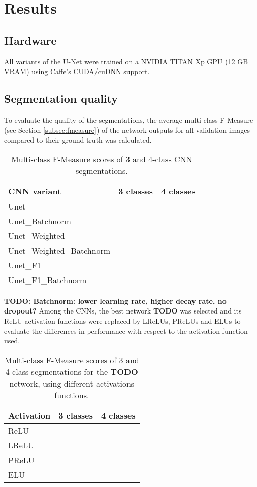 \chapter {Results}
\label{chap:results}

	\section{Hardware}
All variants of the U-Net were trained on a NVIDIA TITAN Xp GPU (12 GB VRAM) using Caffe's CUDA/cuDNN support.

	\section {Segmentation quality}

To evaluate the quality of the segmentations, the average multi-class F-Measure (see Section \ref{subsec:fmeasure}) of the network outputs for all validation images compared to their ground truth was calculated.\\

\begin {table}
	\centering
	\begin {tabular}[!ht]{|l|c|c|}
		\hline
		\textbf{CNN variant}& \textbf{3 classes}& \textbf{4 classes}\\ \hline
		Unet& & \\ \hline
		Unet\_Batchnorm& & \\ \hline
		Unet\_Weighted& & \\ \hline
		Unet\_Weighted\_Batchnorm& & \\ \hline
		Unet\_F1& & \\ \hline
		Unet\_F1\_Batchnorm & & \\ \hline
	\end {tabular}
\caption[]{Multi-class F-Measure scores of 3 and 4-class CNN segmentations.}
\end {table}

\textbf{TODO: Batchnorm: lower learning rate, higher decay rate, no dropout?}
\noindent Among the CNNs, the best network \textbf{TODO} was selected and its ReLU activation functions were replaced by LReLUs, PReLUs and ELUs to evaluate the differences in performance with respect to the activation function used.

\begin {table}
	\centering
	\begin {tabular}[!ht]{|l|c|c|}
		\hline
		\textbf{Activation}& \textbf{3 classes}& \textbf{4 classes}\\ \hline
		ReLU& & \\ \hline
		LReLU& & \\ \hline
		PReLU& & \\ \hline
		ELU& & \\ \hline
	\end {tabular}
\caption[]{Multi-class F-Measure scores of 3 and 4-class segmentations for the \textbf{TODO} network, using different activations functions.}
\end {table}

